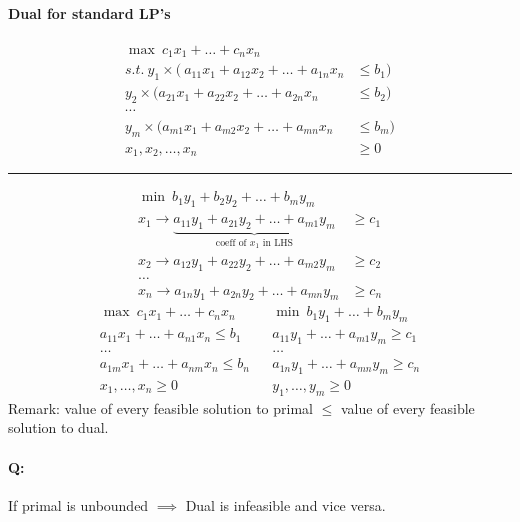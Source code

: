 \documentclass[12 pt]{article}
\begin{document}
          \paragraph{Dual for standard LP's}
          \begin{align*}
            \max \ c_1 x_1 + \ldots + c_n x_n &
            \\ s.t. \ y_1 \times (\ a_{11}x_1 + a_{12}x_2+\ldots + a_{1n}x_{n} & \leq b_1)
            \\ y_2 \times( a_{21}x_1 + a_{22}x_2+\ldots + a_{2n}x_{n} & \leq b_2)
            \\ \cdots
            \\ y_m \times (a_{m1}x_1 + a_{m2}x_2+\ldots + a_{mn}x_{n} & \leq b_m)
            \\ x_1, x_2, \ldots, x_n & \geq 0
          \end{align*}
          \noindent \rule{\textwidth}{0.5pt}
          \begin{align*}
            \min \ b_1y_1 + b_2y_2 + \ldots + b_my_m &
            \\ x_1 \to \underbrace{a_{11}y_1 + a_{21}y_2 + \ldots +
            a_{m1}y_m}_{\text{coeff of $x_1$ in LHS}} & \geq c_1
            \\ x_2 \to a_{12}y_1 + a_{22}y_2 + \ldots + a_{m2}y_m & \geq c_2
            \\ \ldots
            \\ x_n \to a_{1n}y_1 + a_{2n}y_2 + \ldots + a_{mn}y_m & \geq c_n
          \end{align*}
          \begin{align*}
            \max \ c_1x_1 + \ldots + c_n x_n \ &  & \min \ b_1y_1 + \ldots + b_m y_m
                                                    \\ a_{11}x_1 + \ldots + a_{n1}x_n \leq b_1 & & a_{11}y_1 + \ldots + a_{m1}y_m \geq c_1
            \\ \ldots & & \ldots
            \\ a_{1m}x_1 + \ldots + a_{nm}x_n \leq b_n & & a_{1n}y_1 + \ldots + a_{mn}y_m \geq c_n
            \\ x_1, \ldots, x_n \geq 0 & & y_1, \ldots, y_m \geq 0
          \end{align*}
          Remark: value of every feasible solution to primal $\leq$
          value of every feasible solution to dual.
          \paragraph{Q:} If primal is unbounded $\implies$ Dual is
          infeasible and vice versa.
\end{document}
